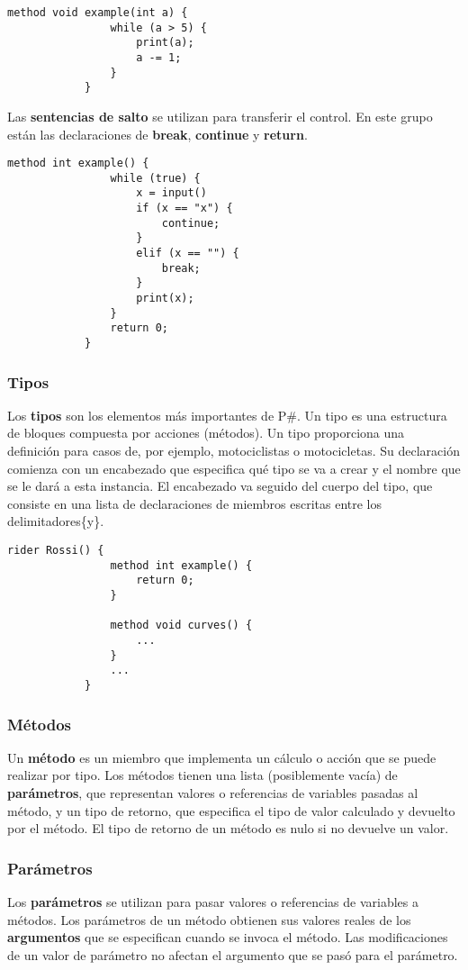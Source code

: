 		\begin{lstlisting}[language={PSharp}]
			method void example(int a) {
				while (a > 5) {
					print(a);
					a -= 1;
				}
			}
		\end{lstlisting}
		
		Las \textbf{sentencias de salto} se utilizan para transferir el control. En este grupo están las declaraciones de \textbf{break}, \textbf{continue} y \textbf{return}.
		
		\begin{lstlisting}[language={PSharp}]
			method int example() {
				while (true) {
					x = input()
					if (x == "x") {
						continue;
					}
					elif (x == "") {
						break;
					}
					print(x);
				}
				return 0;
			}
		\end{lstlisting}
		
	\subsubsection{Tipos}
		Los \textbf{tipos} son los elementos más importantes de P\#. Un tipo es una estructura de bloques compuesta por acciones (métodos). Un tipo proporciona una definición para casos de, por ejemplo, motociclistas o motocicletas. Su declaración comienza con un encabezado que especifica qué tipo se va a crear y el nombre que se le dará a esta instancia. El encabezado va seguido del cuerpo del tipo, que consiste en una lista de declaraciones de miembros escritas entre los delimitadores\{y\}.
		
		\begin{lstlisting}[language={PSharp}]
			rider Rossi() {
				method int example() {    
					return 0;
				}
				
				method void curves() {    
					...
				}
				...
			}
		\end{lstlisting}
	\subsubsection{Métodos}
		Un \textbf{método} es un miembro que implementa un cálculo o acción que se puede realizar por tipo. Los métodos tienen una lista (posiblemente vacía) de \textbf{parámetros}, que representan valores o referencias de variables pasadas al método, y un tipo de retorno, que especifica el tipo de valor calculado y devuelto por el método. El tipo de retorno de un método es nulo si no devuelve un valor.
		
	\subsubsection{Parámetros}
		Los \textbf{parámetros} se utilizan para pasar valores o referencias de variables a métodos. Los parámetros de un método obtienen sus valores reales de los \textbf{argumentos} que se especifican cuando se invoca el método. Las modificaciones de un valor de parámetro no afectan el argumento que se pasó para el parámetro.
			

